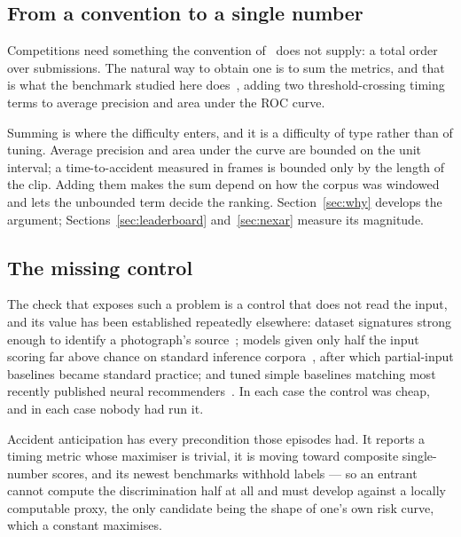 \subsection{From a convention to a single number}

Competitions need something the convention of~\cite{karim2022dsta} does not
supply: a total order over submissions. The natural way to obtain one is to sum
the metrics, and that is what the benchmark studied here
does~\cite{autopilot2026}, adding two threshold-crossing timing terms to
average precision and area under the ROC curve.

Summing is where the difficulty enters, and it is a difficulty of type rather
than of tuning. Average precision and area under the curve are bounded on the
unit interval; a time-to-accident measured in frames is bounded only by the
length of the clip. Adding them makes the sum depend on how the corpus was
windowed and lets the unbounded term decide the ranking.
Section~\ref{sec:why} develops the argument; Sections~\ref{sec:leaderboard}
and~\ref{sec:nexar} measure its magnitude.

\subsection{The missing control}

The check that exposes such a problem is a control that does not read the
input, and its value has been established repeatedly elsewhere: dataset
signatures strong enough to identify a photograph's
source~\cite{torralba2011bias}; models given only half the input scoring far
above chance on standard inference
corpora~\cite{gururangan2018artifacts, poliak2018hypothesis}, after which
partial-input baselines became standard practice; and tuned simple baselines
matching most recently published neural
recommenders~\cite{ferraridacrema2019progress}. In each case the control was
cheap, and in each case nobody had run it.

Accident anticipation has every precondition those episodes had. It reports a
timing metric whose maximiser is trivial, it is moving toward composite
single-number scores, and its newest benchmarks withhold labels --- so an
entrant cannot compute the discrimination half at all and must develop against
a locally computable proxy, the only candidate being the shape of one's own
risk curve, which a constant maximises.

